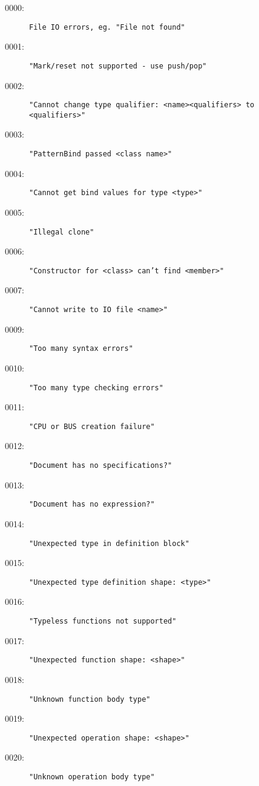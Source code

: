 %
%
%

\begin{description}
\item[0000:] \texttt{File IO errors, eg. "File not found"}
\item[0001:] \texttt{"Mark/reset not supported - use push/pop"}
\item[0002:] \texttt{"Cannot change type qualifier: <name><qualifiers> to <qualifiers>"}
\item[0003:] \texttt{"PatternBind passed <class name>"}
\item[0004:] \texttt{"Cannot get bind values for type <type>"}
\item[0005:] \texttt{"Illegal clone"}
\item[0006:] \texttt{"Constructor for <class> can't find <member>"}
\item[0007:] \texttt{"Cannot write to IO file <name>"}
\item[0009:] \texttt{"Too many syntax errors"}
\item[0010:] \texttt{"Too many type checking errors"}
\item[0011:] \texttt{"CPU or BUS creation failure"}
\item[0012:] \texttt{"Document has no specifications?"}
\item[0013:] \texttt{"Document has no expression?"}
\item[0014:] \texttt{"Unexpected type in definition block"}
\item[0015:] \texttt{"Unexpected type definition shape: <type>"}
\item[0016:] \texttt{"Typeless functions not supported"}
\item[0017:] \texttt{"Unexpected function shape: <shape>"}
\item[0018:] \texttt{"Unknown function body type"}
\item[0019:] \texttt{"Unexpected operation shape: <shape>"}
\item[0020:] \texttt{"Unknown operation body type"}

\end{description}
